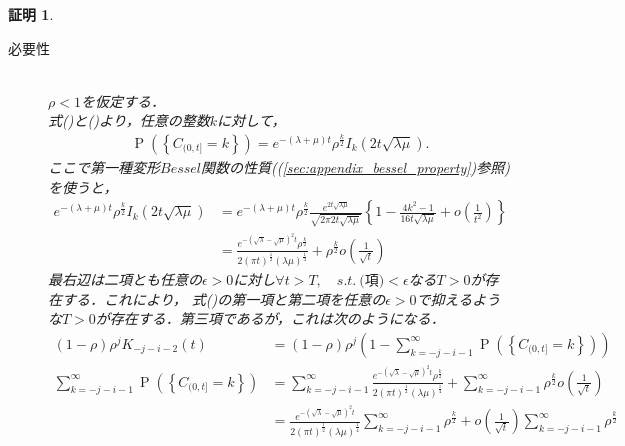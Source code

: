 \documentclass[a4j,papersize,disablejfam,slide,14pt]{jsarticle}
\newtheorem{Proof}{証明}
\def\exp#1{e^{#1}} %
\def\prob#1{\operatorname{P} \left(\left\{ #1 \right\}\right)} %
\begin{document}
    \begin{Proof}
    	\begin{description}
        	\item[必要性]\mbox{}\\
            	$\rho < 1$を仮定する．\\
            	式()と()より，任意の整数$k$に対して，
                \begin{align}
                	\prob{C_{(0, t]}=k} = \exp{-(\lambda+\mu)t}\rho^{\frac{k}{2}} I_k(2t\sqrt{\lambda\mu}).
                \end{align}
                ここで第一種変形$Bessel$関数の性質((\ref{sec:appendix_bessel_property})参照)を使うと，
                \begin{align}
                	\exp{-(\lambda+\mu)t}\rho^{\frac{k}{2}} I_k(2t\sqrt{\lambda\mu}) 
                    &= \exp{-(\lambda+\mu)t}\rho^{\frac{k}{2}} \frac{ \exp{2t\sqrt{\lambda \mu}} }{ \sqrt{2 \pi 2t\sqrt{\lambda \mu}} }
                    	\left\{ 1-\frac{4k^2 - 1}{16t\sqrt{\lambda \mu}} + o\left( \frac{1}{t^2} \right) \right\} \\
                    &= \frac{ \exp{-(\sqrt{\lambda}-\sqrt{\mu})^2 t} \rho^\frac{k}{2} }{ 2(\pi t)^\frac{1}{2} (\lambda \mu)^\frac{1}{4} } + \rho^{\frac{k}{2}} o\left( \frac{1}{\sqrt{t}} \right) \label{eq:prob_c_deform}
                \end{align}
                最右辺は二項とも任意の$\epsilon > 0$に対し$\forall t > T,\quad s.t.\ \mbox{(項)} < \epsilon$なる$T > 0$が存在する．これにより，
                式()の第一項と第二項を任意の$\epsilon > 0$で抑えるような$T > 0$が存在する．第三項であるが，これは次のようになる．
                \begin{align}
                	(1-\rho)\rho^j K_{-j-i-2}(t) &= (1-\rho)\rho^j \left(1 - \sum_{k=-j-i-1}^{\infty} \prob{C_{(0, t]}=k} \right) \\
                    \sum_{k=-j-i-1}^{\infty} \prob{C_{(0, t]}=k} 
                    &= \sum_{k=-j-i-1}^{\infty} \frac{ \exp{-(\sqrt{\lambda}-\sqrt{\mu})^2 t} \rho^\frac{k}{2} }{ 2(\pi t)^\frac{1}{2} (\lambda \mu)^\frac{1}{4} } 
                    	+ \sum_{k=-j-i-1}^{\infty} \rho^{\frac{k}{2}} o\left( \frac{1}{\sqrt{t}} \right) \\
                    &= \frac{ \exp{-(\sqrt{\lambda}-\sqrt{\mu})^2 t} }{ 2(\pi t)^\frac{1}{2} (\lambda \mu)^\frac{1}{4} } \sum_{k=-j-i-1}^{\infty}  \rho^\frac{k}{2} 
                    	+ o\left( \frac{1}{\sqrt{t}} \right) \sum_{k=-j-i-1}^{\infty} \rho^{\frac{k}{2}} \\

\end{align}
\end{description}
\end{Proof}
\end{document}
